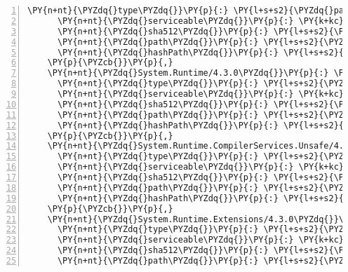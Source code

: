 \begin{Verbatim}[commandchars=\\\{\},numbers=left,firstnumber=1,stepnumber=1,numberblanklines=0]
      \PY{n+nt}{\PYZdq{}type\PYZdq{}}\PY{p}{:} \PY{l+s+s2}{\PYZdq{}package\PYZdq{}}\PY{p}{,}
      \PY{n+nt}{\PYZdq{}serviceable\PYZdq{}}\PY{p}{:} \PY{k+kc}{true}\PY{p}{,}
      \PY{n+nt}{\PYZdq{}sha512\PYZdq{}}\PY{p}{:} \PY{l+s+s2}{\PYZdq{}sha512\PYZhy{}/zrcPkkWdZmI4F92gL/TPumP98AVDu/Wxr3CSJGQQ+XN6wbRZcyfSKVoPo17ilb3iOr0cCRqJInGwNMolqhS8A==\PYZdq{}}\PY{p}{,}
      \PY{n+nt}{\PYZdq{}path\PYZdq{}}\PY{p}{:} \PY{l+s+s2}{\PYZdq{}system.resources.resourcemanager/4.3.0\PYZdq{}}\PY{p}{,}
      \PY{n+nt}{\PYZdq{}hashPath\PYZdq{}}\PY{p}{:} \PY{l+s+s2}{\PYZdq{}system.resources.resourcemanager.4.3.0.nupkg.sha512\PYZdq{}}
    \PY{p}{\PYZcb{}}\PY{p}{,}
    \PY{n+nt}{\PYZdq{}System.Runtime/4.3.0\PYZdq{}}\PY{p}{:} \PY{p}{\PYZob{}}
      \PY{n+nt}{\PYZdq{}type\PYZdq{}}\PY{p}{:} \PY{l+s+s2}{\PYZdq{}package\PYZdq{}}\PY{p}{,}
      \PY{n+nt}{\PYZdq{}serviceable\PYZdq{}}\PY{p}{:} \PY{k+kc}{true}\PY{p}{,}
      \PY{n+nt}{\PYZdq{}sha512\PYZdq{}}\PY{p}{:} \PY{l+s+s2}{\PYZdq{}sha512\PYZhy{}JufQi0vPQ0xGnAczR13AUFglDyVYt4Kqnz1AZaiKZ5+GICq0/1MH/mO/eAJHt/mHW1zjKBJd7kV26SrxddAhiw==\PYZdq{}}\PY{p}{,}
      \PY{n+nt}{\PYZdq{}path\PYZdq{}}\PY{p}{:} \PY{l+s+s2}{\PYZdq{}system.runtime/4.3.0\PYZdq{}}\PY{p}{,}
      \PY{n+nt}{\PYZdq{}hashPath\PYZdq{}}\PY{p}{:} \PY{l+s+s2}{\PYZdq{}system.runtime.4.3.0.nupkg.sha512\PYZdq{}}
    \PY{p}{\PYZcb{}}\PY{p}{,}
    \PY{n+nt}{\PYZdq{}System.Runtime.CompilerServices.Unsafe/4.5.0\PYZhy{}rc1\PYZdq{}}\PY{p}{:} \PY{p}{\PYZob{}}
      \PY{n+nt}{\PYZdq{}type\PYZdq{}}\PY{p}{:} \PY{l+s+s2}{\PYZdq{}package\PYZdq{}}\PY{p}{,}
      \PY{n+nt}{\PYZdq{}serviceable\PYZdq{}}\PY{p}{:} \PY{k+kc}{true}\PY{p}{,}
      \PY{n+nt}{\PYZdq{}sha512\PYZdq{}}\PY{p}{:} \PY{l+s+s2}{\PYZdq{}sha512\PYZhy{}d1OzBivBnuCRYPrRWkzkafwTwAQBEGyKYjX9HwFhT+YOWun77AyAMIS++UsLq0z0j1HfHx8iI5ZAt8+kXwfnFw==\PYZdq{}}\PY{p}{,}
      \PY{n+nt}{\PYZdq{}path\PYZdq{}}\PY{p}{:} \PY{l+s+s2}{\PYZdq{}system.runtime.compilerservices.unsafe/4.5.0\PYZhy{}rc1\PYZdq{}}\PY{p}{,}
      \PY{n+nt}{\PYZdq{}hashPath\PYZdq{}}\PY{p}{:} \PY{l+s+s2}{\PYZdq{}system.runtime.compilerservices.unsafe.4.5.0\PYZhy{}rc1.nupkg.sha512\PYZdq{}}
    \PY{p}{\PYZcb{}}\PY{p}{,}
    \PY{n+nt}{\PYZdq{}System.Runtime.Extensions/4.3.0\PYZdq{}}\PY{p}{:} \PY{p}{\PYZob{}}
      \PY{n+nt}{\PYZdq{}type\PYZdq{}}\PY{p}{:} \PY{l+s+s2}{\PYZdq{}package\PYZdq{}}\PY{p}{,}
      \PY{n+nt}{\PYZdq{}serviceable\PYZdq{}}\PY{p}{:} \PY{k+kc}{true}\PY{p}{,}
      \PY{n+nt}{\PYZdq{}sha512\PYZdq{}}\PY{p}{:} \PY{l+s+s2}{\PYZdq{}sha512\PYZhy{}guW0uK0fn5fcJJ1tJVXYd7/1h5F+pea1r7FLSOz/f8vPEqbR2ZAknuRDvTQ8PzAilDveOxNjSfr0CHfIQfFk8g==\PYZdq{}}\PY{p}{,}
      \PY{n+nt}{\PYZdq{}path\PYZdq{}}\PY{p}{:} \PY{l+s+s2}{\PYZdq{}system.runtime.extensions/4.3.0\PYZdq{}}\PY{p}{,}

\end{Verbatim}
